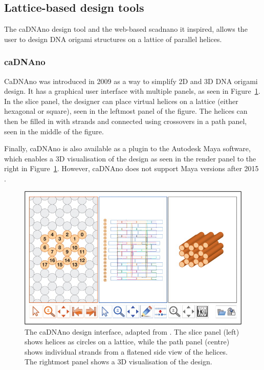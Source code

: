 \subsection{Lattice-based design tools}
The caDNAno design tool \cite{cadnano} and the web-based scadnano \cite{scadnano} it inspired, allows the user to design DNA origami structures on a lattice of parallel helices.

\subsubsection{caDNAno}
\label{sec:cadnano}
CaDNAno \cite{cadnano} was introduced in 2009 as a way to simplify 2D and 3D DNA origami design. It has a graphical user interface with multiple panels, as seen in Figure~\ref{fig:cadnano}. In the slice panel, the designer can place virtual helices on a lattice (either hexagonal or square), seen in the leftmost panel of the figure. The helices can then be filled in with strands and connected using crossovers in a path panel, seen in the middle of the figure.

Finally, caDNAno is also available as a plugin to the Autodesk Maya software, which enables a 3D visualisation of the design as seen in the render panel to the right in Figure~\ref{fig:cadnano}. However, caDNAno does not support Maya versions after 2015 \cite{cadnanoInstall}.

\begin{figure}[ht]
  \begin{center}
    \includegraphics[width=\textwidth]{figures/cadnano.jpeg}
    \caption{The caDNAno design interface, adapted from \cite{cadnano}. The slice panel (left) shows helices as circles on a lattice, while the path panel (centre) shows individual strands from a flatened side view of the helices. The rightmost panel shows a 3D visualisation of the design.}
    \label{fig:cadnano}
  \end{center}
\end{figure}

